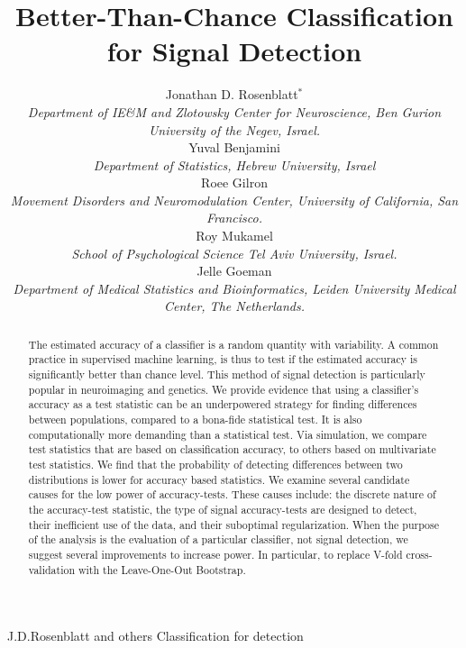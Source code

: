 \documentclass[oupdraft]{bio}
\begin{document}
\title{Better-Than-Chance Classification for Signal Detection}

\author{Jonathan D. Rosenblatt$^\ast$ \\ 
	\textit{Department of IE\&M and Zlotowsky Center for Neuroscience, 
		Ben Gurion University of the Negev, Israel.} 
	\\ Yuval Benjamini \\
	\textit{Department of Statistics, Hebrew University, Israel}	
	\\ Roee Gilron \\ 
	\textit{Movement Disorders and Neuromodulation Center, University of California, San Francisco.}
	\\ Roy Mukamel \\ 
	\textit{School of Psychological Science Tel Aviv University, Israel.}
	\\ Jelle Goeman \\ 
	\textit{Department of Medical Statistics and Bioinformatics, Leiden University Medical Center, The Netherlands.}
}


\markboth%
{J.D.Rosenblatt and others}
{Classification for detection}

\maketitle


\begin{abstract}
{
	The estimated accuracy of a classifier is a random quantity with variability. 
	A common practice in supervised machine learning, is thus to test if the estimated accuracy is significantly better than chance level.
	This method of signal detection is particularly popular in neuroimaging and genetics.
	We provide evidence that using a classifier's accuracy as a test statistic can be an underpowered strategy for finding differences between populations, compared to a bona-fide statistical test.
	It is also computationally more demanding than a statistical test. 
	Via simulation, we compare test statistics that are based on classification accuracy, to others based on multivariate test statistics. 
	We find that the probability of detecting differences between two distributions is lower for accuracy based statistics.
	We examine several candidate causes for the low power of accuracy-tests. 
	These causes include: the discrete nature of the accuracy-test statistic, the type of signal accuracy-tests are designed to detect, their inefficient use of the data, and their suboptimal regularization. 
	When the purpose of the analysis is the evaluation of a particular classifier, not signal detection, we suggest several improvements to increase power. 
	In particular, to replace V-fold cross-validation with the Leave-One-Out Bootstrap.
	}
\end{abstract}
\end{document}
